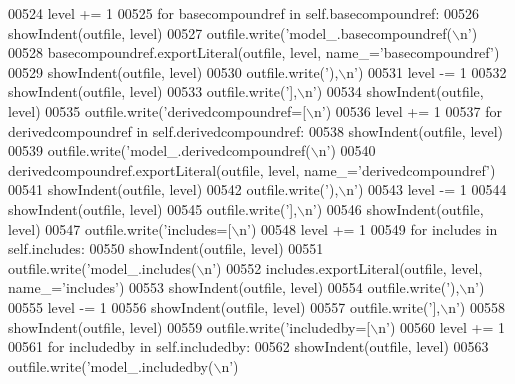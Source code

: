 \begin{DoxyCode}
{{{{{{{{{{{{{{{{{{{{{{{{{{{{{{{{{{{00524         level += 1
00525         \textcolor{keywordflow}{for} basecompoundref \textcolor{keywordflow}{in} self.basecompoundref:
00526             showIndent(outfile, level)
00527             outfile.write(\textcolor{stringliteral}{'model\_.basecompoundref(\(\backslash\)n'})
00528             basecompoundref.exportLiteral(outfile, level, name\_=\textcolor{stringliteral}{'basecompoundref'})
00529             showIndent(outfile, level)
00530             outfile.write(\textcolor{stringliteral}{'),\(\backslash\)n'})
00531         level -= 1
00532         showIndent(outfile, level)
00533         outfile.write(\textcolor{stringliteral}{'],\(\backslash\)n'})
00534         showIndent(outfile, level)
00535         outfile.write(\textcolor{stringliteral}{'derivedcompoundref=[\(\backslash\)n'})
00536         level += 1
00537         \textcolor{keywordflow}{for} derivedcompoundref \textcolor{keywordflow}{in} self.derivedcompoundref:
00538             showIndent(outfile, level)
00539             outfile.write(\textcolor{stringliteral}{'model\_.derivedcompoundref(\(\backslash\)n'})
00540             derivedcompoundref.exportLiteral(outfile, level, name\_=\textcolor{stringliteral}{'derivedcompoundref'})
00541             showIndent(outfile, level)
00542             outfile.write(\textcolor{stringliteral}{'),\(\backslash\)n'})
00543         level -= 1
00544         showIndent(outfile, level)
00545         outfile.write(\textcolor{stringliteral}{'],\(\backslash\)n'})
00546         showIndent(outfile, level)
00547         outfile.write(\textcolor{stringliteral}{'includes=[\(\backslash\)n'})
00548         level += 1
00549         \textcolor{keywordflow}{for} includes \textcolor{keywordflow}{in} self.includes:
00550             showIndent(outfile, level)
00551             outfile.write(\textcolor{stringliteral}{'model\_.includes(\(\backslash\)n'})
00552             includes.exportLiteral(outfile, level, name\_=\textcolor{stringliteral}{'includes'})
00553             showIndent(outfile, level)
00554             outfile.write(\textcolor{stringliteral}{'),\(\backslash\)n'})
00555         level -= 1
00556         showIndent(outfile, level)
00557         outfile.write(\textcolor{stringliteral}{'],\(\backslash\)n'})
00558         showIndent(outfile, level)
00559         outfile.write(\textcolor{stringliteral}{'includedby=[\(\backslash\)n'})
00560         level += 1
00561         \textcolor{keywordflow}{for} includedby \textcolor{keywordflow}{in} self.includedby:
00562             showIndent(outfile, level)
00563             outfile.write(\textcolor{stringliteral}{'model\_.includedby(\(\backslash\)n'})
}}}}}}}}}}}}}}}}}}}}}}}}}}}}}}}}}}}
\end{DoxyCode}
